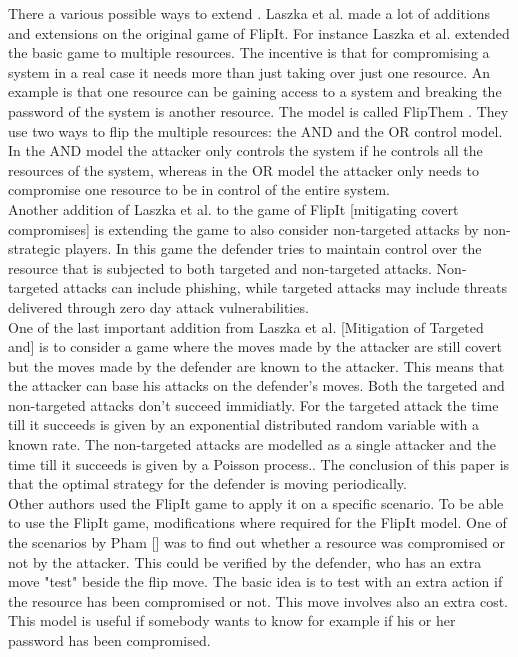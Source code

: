 There a various possible ways to extend . 
Laszka et al. made a lot of additions and extensions on the original game of FlipIt. For instance Laszka et al. extended the basic  game to multiple resources. The incentive is that for compromising a system in a real case it needs more than just taking over just one resource. An example is that one resource can be gaining access to a system and breaking the password of the system is another resource. The model is called FlipThem \cite{FlipThem}. They use two ways to flip the multiple resources: the AND and the OR control model. In the AND model the attacker only controls the system if he controls all the resources of the system, whereas in the OR model the attacker only needs to compromise one resource to be in control of the entire system. \\
Another addition of Laszka et al. to the game of FlipIt [mitigating covert compromises] is extending the game to also consider non-targeted attacks by non-strategic players. In this game the defender tries to maintain control over the resource that is subjected to both targeted and non-targeted attacks. Non-targeted attacks can include phishing, while targeted attacks may include threats delivered through zero day attack vulnerabilities. \\
One of the last important addition from Laszka et al. [Mitigation of Targeted and] is to consider a game where the moves made by the attacker are still covert but the moves made by the defender are known to the attacker. This means that the attacker can base his attacks on the defender's moves. Both the targeted and non-targeted attacks don't succeed immidiatly. For the targeted attack the time till it succeeds is given by an exponential distributed random variable with a known rate. The non-targeted attacks are modelled as a single attacker and the time till it succeeds is given by a Poisson process.. The conclusion of this paper is that the optimal strategy for the defender is moving periodically. \\ 

Other authors used the FlipIt game to apply it on a specific scenario. To be able to use the FlipIt game, modifications where required for the FlipIt model.
One of the scenarios by Pham\cite{GameTheorApprCostBenefitAnalyses} [] was to find out whether a resource was compromised or not by the attacker. This could be verified by the defender, who has an extra move "test" beside the flip move. The basic idea is to test with an extra action if the resource has been compromised or not. This move involves also an extra cost. This model is useful if somebody wants to know for example if his or her password has been compromised.   \\

